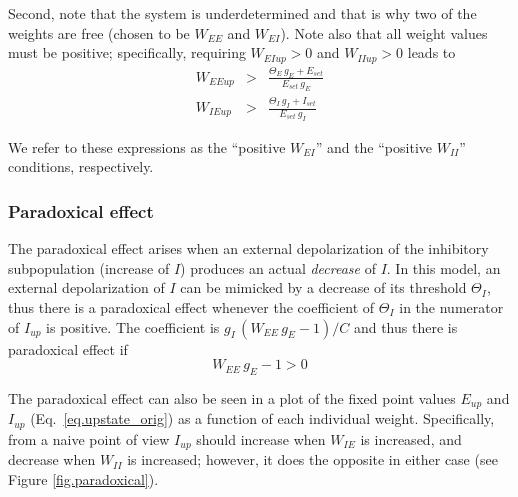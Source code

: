 \documentclass[twocolumn]{article}
\newcommand{\EE}{\mathit{EE}}
\newcommand{\EI}{\mathit{EI}}
\newcommand{\IE}{\mathit{IE}}
\newcommand{\II}{\mathit{II}}
\newcommand{\set}{\mathit{set}}
\newcommand{\up}{\mathit{up}}
\begin{document}
Second, note that the system is underdetermined and that is why two of the weights are free (chosen to be $W_{\EE}$ and $W_{\EI}$). Note also that all weight values must be positive; specifically, requiring $W_{\EI\up}>0$ and $W_{\II\up}>0$ leads to
\begin{eqnarray}
W_{\EE\up} & > & \frac{\Theta_E \, g_E + E_{\set}}{E_{\set} \, g_E}
\label{eq.positive_WEI} \\
W_{\IE\up} & > & \frac{\Theta_I \, g_I + I_{\set}}{E_{\set} \, g_I}
\label{eq.positive_WII}
\end{eqnarray}

\noindent We refer to these expressions as the ``positive $W_{\EI}$'' and the ``positive $W_{\II}$'' conditions, respectively.



\subsubsection{Paradoxical effect}

The paradoxical effect arises when an external depolarization of the inhibitory subpopulation (increase of $I$) produces an actual {\em decrease} of $I$. In this model, an external depolarization of $I$ can be mimicked by a decrease of its threshold $\Theta_I$, thus there is a paradoxical effect whenever the coefficient of $\Theta_I$ in the numerator of $I_{up}$ is positive. The coefficient is $g_I \, (W_{\EE} \, g_E - 1)/C$ and thus there is paradoxical effect if
\begin{equation}
W_{\EE} \, g_E - 1 >0
\label{eq.paradoxical}
\end{equation}

The paradoxical effect can also be seen in a plot of the fixed point values $E_{\up}$ and $I_{\up}$ (Eq.\ \ref{eq.upstate_orig}) as a function of each individual weight. Specifically, from a naive point of view $I_{\up}$ should increase when $W_{\IE}$ is increased, and decrease when $W_{\II}$ is increased; however, it does the opposite in either case (see Figure \ref{fig.paradoxical}).
\end{document}
